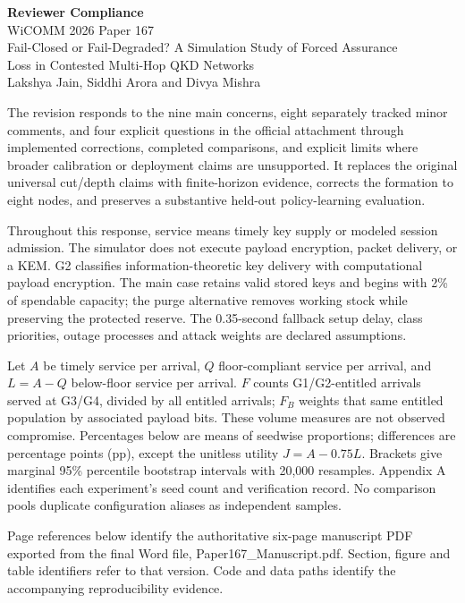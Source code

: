 \documentclass[a4paper,11pt]{article}
\begin{document}
\begin{center}
{\fontsize{18}{21}\selectfont\bfseries Reviewer Compliance}\\[5pt]
{\large WiCOMM 2026 Paper 167}\\[7pt]
{\normalsize Fail-Closed or Fail-Degraded? A Simulation Study of Forced Assurance\\
Loss in Contested Multi-Hop QKD Networks}\\[5pt]
{\normalsize Lakshya Jain, Siddhi Arora and Divya Mishra}
\end{center}
\vspace{4pt}
The revision responds to the nine main concerns, eight separately tracked minor comments, and four explicit questions in the official attachment through implemented corrections, completed comparisons, and explicit limits where broader calibration or deployment claims are unsupported. It replaces the original universal cut/depth claims with finite-horizon evidence, corrects the formation to eight nodes, and preserves a substantive held-out policy-learning evaluation.

Throughout this response, service means timely key supply or modeled session admission. The simulator does not execute payload encryption, packet delivery, or a KEM. G2 classifies information-theoretic key delivery with computational payload encryption. The main case retains valid stored keys and begins with 2\% of spendable capacity; the purge alternative removes working stock while preserving the protected reserve. The 0.35-second fallback setup delay, class priorities, outage processes and attack weights are declared assumptions.

Let \(A\) be timely service per arrival, \(Q\) floor-compliant service per arrival, and \(L=A-Q\) below-floor service per arrival. \(F\) counts G1/G2-entitled arrivals served at G3/G4, divided by all entitled arrivals; \(F_B\) weights that same entitled population by associated payload bits. These volume measures are not observed compromise. Percentages below are means of seedwise proportions; differences are percentage points (pp), except the unitless utility \(J=A-0.75L\). Brackets give marginal 95\% percentile bootstrap intervals with 20,000 resamples. Appendix A identifies each experiment's seed count and verification record. No comparison pools duplicate configuration aliases as independent samples.

Page references below identify the authoritative six-page manuscript PDF exported from the final Word file, Paper167\_Manuscript.pdf. Section, figure and table identifiers refer to that version. Code and data paths identify the accompanying reproducibility evidence.
\end{document}
